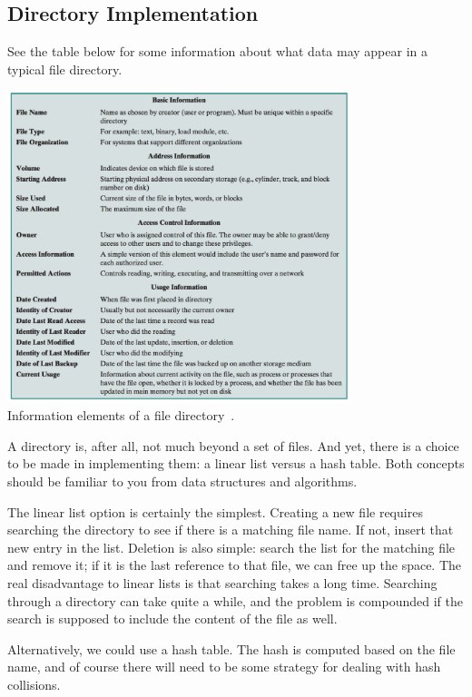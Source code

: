\subsection*{Directory Implementation} 

See the table below for some information about what data may appear in a typical file directory.

\begin{center}
	\includegraphics[width=0.75\textwidth]{images/directory.png}\\
	Information elements of a file directory~\cite{osi}.
\end{center}


A directory is, after all, not much beyond a set of files. And yet, there is a choice to be made in implementing them: a linear list versus a hash table. Both concepts should be familiar to you from data structures and algorithms.

The linear list option is certainly the simplest. Creating a new file requires searching the directory to see if there is a matching file name. If not, insert that new entry in the list. Deletion is also simple: search the list for the matching file and remove it; if it is the last reference to that file, we can free up the space. The real disadvantage to linear lists is that searching takes a long time. Searching through a directory can take quite a while, and the problem is compounded if the search is supposed to include the content of the file as well.

Alternatively, we could use a hash table. The hash is computed based on the file name, and of course there will need to be some strategy for dealing with hash collisions. 



